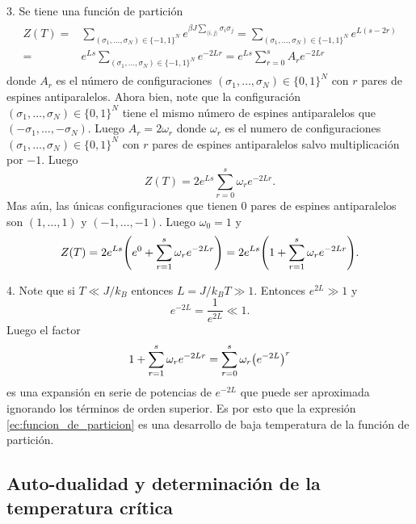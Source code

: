 \documentclass{article}
\begin{document}
3. Se tiene una función de partición
\begin{align}
\begin{split}
Z(T)=&\sum_{(\sigma_1,\dots,\sigma_N)\in\{-1,1\}^N}e^{\beta J\sum\limits_{\langle i,j\rangle}\sigma_i\sigma_j}=\sum_{(\sigma_1,\dots,\sigma_N)\in\{-1,1\}^N}e^{L(s-2r)}\\
=&e^{Ls}\sum_{(\sigma_1,\dots,\sigma_N)\in\{-1,1\}^N}e^{-2Lr}=e^{Ls}\sum_{r=0}^s A_re^{-2Lr}
\end{split}
\end{align}
donde $A_r$ es el número de configuraciones $(\sigma_1,\dots,\sigma_N)\in\{0,1\}^N$ con $r$ pares de espines antiparalelos. Ahora bien, note que la configuración $(\sigma_1,\dots,\sigma_N)\in\{0,1\}^N$ tiene el mismo número de espines antiparalelos que $(-\sigma_1,\dots,-\sigma_N)$. Luego $A_r=2\omega_r$ donde $\omega_r$ es el numero de configuraciones $(\sigma_1,\dots,\sigma_N)\in\{0,1\}^N$ con $r$ pares de espines antiparalelos salvo multiplicación por $-1$. Luego
\begin{equation}
Z(T)=2e^{Ls}\sum_{r=0}^s\omega_re^{-2Lr}.
\end{equation}
Mas aún, las únicas configuraciones que tienen $0$ pares de espines antiparalelos son $(1,\dots,1)$ y $(-1,\dots,-1)$. Luego $\omega_0=1$ y 
\begin{equation}\label{ec:funcion_de_particion}
Z(T)=2e^{Ls}\qty(e^0+\sum_{r=1}^s\omega_re^{-2Lr})=2e^{Ls}\qty(1+\sum_{r=1}^s\omega_re^{-2Lr}).
\end{equation}

4. Note que si $T\ll J/k_B$ entonces $L=J/k_B T\gg 1$. Entonces $e^{2L}\gg 1$ y 
\begin{equation}
e^{-2L}=\frac{1}{e^{2L}}\ll 1.
\end{equation}
Luego el factor
\begin{equation}
1+\sum_{r=1}^s\omega_re^{-2Lr}=\sum_{r=0}^s\omega_r\qty(e^{-2L})^r
\end{equation}
es una expansión en serie de potencias de $e^{-2L}$ que puede ser aproximada ignorando los términos de orden superior. Es por esto que la expresión \eqref{ec:funcion_de_particion} es una desarrollo de baja temperatura de la función de partición. 

\subsection{Auto-dualidad y determinación de la temperatura crítica}
\end{document}

